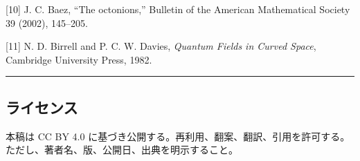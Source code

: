 \documentclass[
]{ltjsarticle}
\begin{document}
{[}10{]} J. C. Baez, ``The octonions,'' Bulletin of the American
Mathematical Society 39 (2002), 145--205.

{[}11{]} N. D. Birrell and P. C. W. Davies, \emph{Quantum Fields in
Curved Space}, Cambridge University Press, 1982.

\begin{center}\rule{0.5\linewidth}{0.5pt}\end{center}

\subsection{ライセンス}\label{ux30e9ux30a4ux30bbux30f3ux30b9}

本稿は CC BY 4.0
に基づき公開する。再利用、翻案、翻訳、引用を許可する。ただし、著者名、版、公開日、出典を明示すること。
\end{document}
